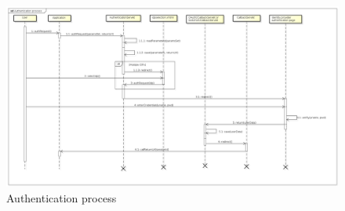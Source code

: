 \documentclass[oneside]{scrreprt}
\newcommand{\unicert}{\mbox{UniCert}}
\begin{document}
\begin{figure}[ht]
\centerline{
\includegraphics[width=1.0\textwidth]{figs/authentication_process}}
\caption{Authentication process}
\label{fig:auth_process}
\end{figure}


%
%
\end{document}
